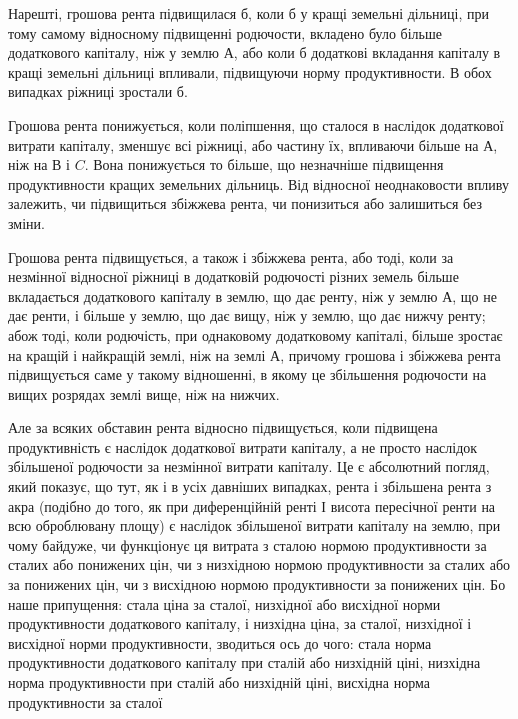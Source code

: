 
Нарешті, грошова рента підвищилася б, коли б у кращі земельні дільниці,
при тому самому відносному підвищенні родючости, вкладено було більше
додаткового капіталу, ніж у землю $А$, або коли б додаткові вкладання капіталу в кращі
земельні дільниці впливали, підвищуючи норму продуктивности. В обох випадках
ріжниці зростали б.

Грошова рента понижується, коли поліпшення, що сталося в наслідок
додаткової витрати капіталу, зменшує всі ріжниці, або частину їх, впливаючи
більше на $А$, ніж на $В$ і $C$. Вона понижується то більше, що незначніше
підвищення продуктивности кращих земельних дільниць. Від відносної неоднаковости
впливу залежить, чи підвищиться збіжжева рента, чи понизиться або
залишиться без зміни.

Грошова рента підвищується, а також і збіжжева рента, або тоді, коли за
незмінної відносної ріжниці в додатковій родючості різних земель більше вкладається
додаткового капіталу в землю, що дає ренту, ніж у землю $А$, що не дає
ренти, і більше у землю, що дає вищу, ніж у землю, що дає нижчу ренту;
абож тоді, коли родючість, при однаковому додатковому капіталі, більше зростає
на кращій і найкращій землі, ніж на землі $А$, причому грошова і збіжжева
рента підвищується саме у такому відношенні, в якому це збільшення родючости
на вищих розрядах землі вище, ніж на нижчих.

Але за всяких обставин рента відносно підвищується, коли підвищена продуктивність
є наслідок додаткової витрати капіталу, а не просто наслідок
збільшеної родючости за незмінної витрати капіталу. Це є абсолютний погляд,
який показує, що тут, як і в усіх давніших випадках, рента і збільшена рента з акра
(подібно до того, як при диференційній ренті І висота пересічної ренти на всю
оброблювану площу) є наслідок збільшеної витрати капіталу на землю, при
чому байдуже, чи функціонує ця витрата з сталою нормою продуктивности за
сталих або понижених цін, чи з низхідною нормою продуктивности за сталих або
за понижених цін, чи з висхідною нормою продуктивности за понижених цін.
Бо наше припущення: стала ціна за сталої, низхідної або висхідної норми продуктивности додаткового
капіталу, і низхідна ціна, за сталої, низхідної і висхідної
норми продуктивности, зводиться ось до чого: стала норма продуктивности додаткового капіталу при
сталій або низхідній ціні, низхідна норма продуктивности
при сталій або низхідній ціні, висхідна норма продуктивности за сталої
\parbreak{}  %
